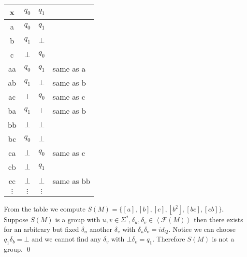 \documentclass[a4paper,12pt,numbers=noenddot]{scrreport}
\def\lsk{\left<}
\def\rsk{\right>}
\begin{document}
\chapter{}
\section{}
\section{}
\section{}
\begin{center}
\begin{tabular}{c|cc|l}
x & $q_0$ & $q_1$   \\ \hline
a & $q_0$ & $q_1$   \\
b & $q_1$ & $\bot$  \\
c & $\bot$ & $q_0$  \\ \hline
aa & $q_0$ & $q_1$ & same as a \\ 
ab & $q_1$ & $\bot$ & same as b \\ 
ac & $\bot$ & $q_0$ & same as c \\ 
ba & $q_1$ & $\bot$ & same as b \\ 
bb & $\bot$ & $\bot$ \\ 
bc & $q_0$ & $\bot$ \\ 
ca & $\bot$ & $q_0$ & same as c \\ 
cb & $\bot$ & $q_1$ \\ 
cc & $\bot$ & $\bot$ & same as bb \\ \hline
$\vdots$ & $\vdots$ & $\vdots$ & \\
\end{tabular}
\end{center}
From the table we compute $S(M) = \{[a], [b], [c], [b^2], [bc], [cb]\}$.
Suppose $S(M)$ is a group with $u,v \in \Sigma^*, \delta_u, \delta_v \in \lsk \mathcal{F}(M) \rsk$ then there exists for an arbitrary but fixed $\delta_u$ another $\delta_v$ with $\delta_u \delta_v = id_Q$.
Notice we can choose $q_1\delta_b = \bot$ and we cannot find any $\delta_v$ with $\bot \delta_v = q_1$.
Therefore $S(M)$ is not a group.
\qed

\section{}
\end{document}
